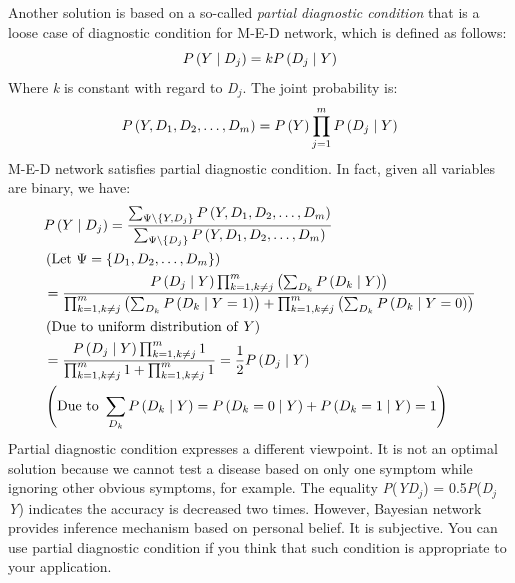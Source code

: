 \documentclass{article}
\numberwithin{equation}{section}
\numberwithin{figure}{section}
\numberwithin{table}{section}
\begin{document}
Another solution is based on a so-called \textit{partial diagnostic condition} that is a loose case of diagnostic condition for M-E-D network, which is defined as follows:
\[P\left(Y\mathrel{\left|\vphantom{Y D_j}\right.\kern-\nulldelimiterspace}D_j\right)=kP\left(D_j\mathrel{\left|\vphantom{D_j Y}\right.\kern-\nulldelimiterspace}Y\right)\] 
Where \textit{k} is constant with regard to \textit{D${}_{j}$}. The joint probability is:
\[P\left(Y,D_1,D_2,\dots ,D_m\right)=P\left(Y\right)\prod^m_{j=1}{P\left(D_j\mathrel{\left|\vphantom{D_j Y}\right.\kern-\nulldelimiterspace}Y\right)}\] 
M-E-D network satisfies partial diagnostic condition. In fact, given all variables are binary, we have:
\begin{align*}
&P\left(Y\mathrel{\left|\vphantom{Y D_j}\right.\kern-\nulldelimiterspace}D_j\right)=\frac{\sum_{\mathrm{\Psi }\backslash \left\{Y,D_j\right\}}{P\left(Y,D_1,D_2,\dots ,D_m\right)}}{\sum_{\mathrm{\Psi }\backslash \left\{D_j\right\}}{P\left(Y,D_1,D_2,\dots ,D_m\right)}}\\
&\left(\mathrm{Let}\ \Psi=\left\{D_1,D_2,\dots,D_m\right\}\right)\\
&=\frac{P\left(D_j\mathrel{\left|\vphantom{D_j Y}\right.\kern-\nulldelimiterspace}Y\right)\prod^m_{k=1,k\neq j}{\left(\sum_{D_k}{P\left(D_k\mathrel{\left|\vphantom{D_k Y}\right.\kern-\nulldelimiterspace}Y\right)}\right)}}{\prod^m_{k=1,k\neq j}{\left(\sum_{D_k}{P\left(D_k\mathrel{\left|\vphantom{D_k Y=1}\right.\kern-\nulldelimiterspace}Y=1\right)}\right)}+\prod^m_{k=1,k\neq j}{\left(\sum_{D_k}{P\left(D_k\mathrel{\left|\vphantom{D_k Y=0}\right.\kern-\nulldelimiterspace}Y=0\right)}\right)}}\\
&\left(\mathrm{Due}\ \mathrm{to}\ \mathrm{uniform}\ \mathrm{distribution}\ \mathrm{of}\ Y\right)\\
&=\frac{P\left(D_j\mathrel{\left|\vphantom{D_j Y}\right.\kern-\nulldelimiterspace}Y\right)\prod^m_{k=1,k\neq j}{1}}{\prod^m_{k=1,k\neq j}{1}+\prod^m_{k=1,k\neq j}{1}}=\frac{1}{2}P\left(D_j\mathrel{\left|\vphantom{D_j Y}\right.\kern-\nulldelimiterspace}Y\right)\\
&\left(\mathrm{Due\ to}\ \sum_{D_k}{P\left(D_k\mathrel{\left|\vphantom{D_k Y}\right.\kern-\nulldelimiterspace}Y\right)}=P\left(D_k=0\mathrel{\left|\vphantom{D_k=0 Y}\right.\kern-\nulldelimiterspace}Y\right)+P\left(D_k=1\mathrel{\left|\vphantom{D_k=1 Y}\right.\kern-\nulldelimiterspace}Y\right)=1\right)
\end{align*}
Partial diagnostic condition expresses a different viewpoint. It is not an optimal solution because we cannot test a disease based on only one symptom while ignoring other obvious symptoms, for example. The equality \textit{P}(\textit{Y{\textbar}D${}_{j}$}) = 0.5\textit{P}(\textit{D${}_{j}${\textbar}Y}) indicates the accuracy is decreased two times. However, Bayesian network provides inference mechanism based on personal belief. It is subjective. You can use partial diagnostic condition if you think that such condition is appropriate to your application.
\end{document}
